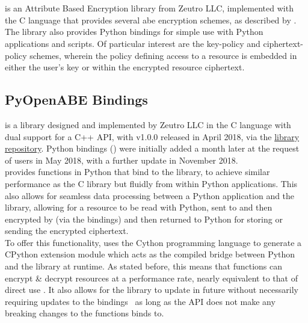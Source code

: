 \section{\OpenABE}
\label{sec:bkgr_openabe}

\OpenABE is an Attribute Based Encryption library from Zeutro LLC, implemented with the C language that provides several \acrshort{abe} encryption schemes, as described by \citet{Akinyele2011}. The library also provides Python bindings for simple use with Python applications and scripts. Of particular interest are the key-policy and ciphertext-policy schemes, wherein the policy defining access to a resource is embedded in either the user's key or within the encrypted resource ciphertext.

\subsection{PyOpenABE Bindings}
\label{subsec:bkgr_pyopenabe}

\OpenABE is a library designed and implemented by Zeutro LLC in the C language with dual support for a C++ API, with v1.0.0 released in April 2018, via the \href{https://github.com/zeutro/openabe/releases}{\OpenABE library repository}. Python bindings (\PyOpenABE) were initially added a month later at the request of users in May 2018, with a further update in November 2018.\\
\PyOpenABE provides functions in Python that bind to the \OpenABE library, to achieve similar performance as the C library but fluidly from within Python applications. This also allows for seamless data processing between a Python application and the \OpenABE library, allowing for a resource to be read with Python, sent to and then encrypted by \OpenABE (via the \PyOpenABE bindings) and then returned to Python for storing or sending the encrypted ciphertext.\\
To offer this functionality, \PyOpenABE uses the Cython programming language to generate a CPython extension module which acts as the compiled bridge between Python and the \OpenABE library at runtime. As stated before, this means that \PyOpenABE functions can encrypt \& decrypt resources at a performance rate, nearly equivalent to that of direct \OpenABE use \citep{Akinyele2011}. It also allows for the \OpenABE library to update in future without necessarily requiring updates to the \PyOpenABE bindings \textemdash\ as long as the \OpenABE API does not make any breaking changes to the functions \PyOpenABE binds to.

